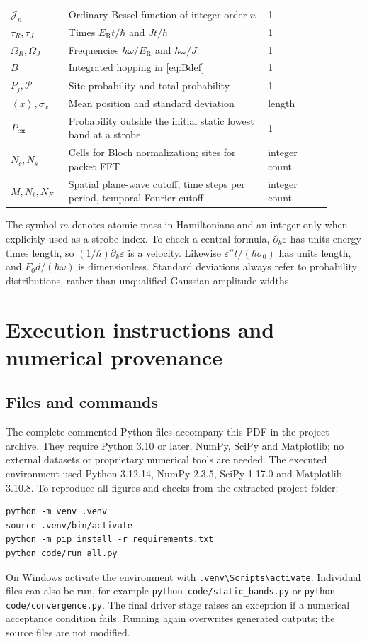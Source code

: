 \documentclass[11pt,oneside]{report}
\numberwithin{equation}{chapter}
\newcommand{\ER}{E_{\mathrm R}}
\newcommand{\avg}[1]{\left\langle #1\right\rangle}
\begin{document}
{\begin{longtable}{P{0.16\linewidth}P{0.56\linewidth}P{0.18\linewidth}}
$\mathcal J_n$&Ordinary Bessel function of integer order $n$&1\\
$\tau_R,\tau_J$&Times $\ER t/\hbar$ and $Jt/\hbar$&1\\
$\Omega_R,\Omega_J$&Frequencies $\hbar\omega/\ER$ and $\hbar\omega/J$&1\\
$B$&Integrated hopping in \cref{eq:Bdef}&1\\
$P_j,\mathcal P$&Site probability and total probability&1\\
$\avg x,\sigma_x$&Mean position and standard deviation&length\\
$P_{\rm ex}$&Probability outside the initial static lowest band at a strobe&1\\
$N_c,N_s$&Cells for Bloch normalization; sites for packet FFT&integer count\\
$M,N_t,N_F$&Spatial plane-wave cutoff, time steps per period, temporal Fourier cutoff&integer count\\
\bottomrule
\end{longtable}
}
The symbol $m$ denotes atomic mass in Hamiltonians and an integer only when explicitly used as a strobe index. To check a central formula, $\partial_k\varepsilon$ has units energy times length, so $(1/\hbar)\partial_k\varepsilon$ is a velocity. Likewise $\varepsilon''t/(\hbar\sigma_0)$ has units length, and $F_0d/(\hbar\omega)$ is dimensionless. Standard deviations always refer to probability distributions, rather than unqualified Gaussian amplitude widths.

\chapter{Execution instructions and numerical provenance}
\section{Files and commands}
The complete commented Python files accompany this PDF in the project archive. They require Python 3.10 or later, NumPy, SciPy and Matplotlib; no external datasets or proprietary numerical tools are needed. The executed environment used Python 3.12.14, NumPy 2.3.5, SciPy 1.17.0 and Matplotlib 3.10.8. To reproduce all figures and checks from the extracted project folder:
\begin{lstlisting}
python -m venv .venv
source .venv/bin/activate
python -m pip install -r requirements.txt
python code/run_all.py
\end{lstlisting}
On Windows activate the environment with \texttt{.venv\textbackslash Scripts\textbackslash activate}. Individual files can also be run, for example \texttt{python code/static\_bands.py} or \texttt{python code/convergence.py}. The final driver stage raises an exception if a numerical acceptance condition fails. Running again overwrites generated outputs; the source files are not modified.
\end{document}
